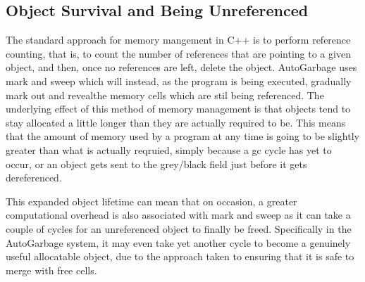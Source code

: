 \documentclass[11pt]{article}
\begin{document}
\subsection{Object Survival and Being Unreferenced}
\label{sec:org57a7dd4}
The standard approach for memory mangement in C++ is to perform reference counting, that is, to count the number of references
that are pointing to a given object, and then, once no references are left, delete the object. AutoGarbage uses mark 
and sweep which will instead, as the program is being executed, gradually mark out and revealthe memory cells which are stil
being referenced. The underlying effect of this method of memory management is that objects
tend to stay allocated a little longer than they are actually required to be.
This means that the amount of memory used by a program at any time is going to be slightly greater than what is actually 
reqruied, simply because a gc cycle has yet to occur, or an object gets sent to the grey/black field just before it gets dereferenced.

This expanded object lifetime can mean that on occasion, a greater computational overhead is also associated with mark and sweep
as it can take a couple of cycles for an unreferenced object to finally be freed. Specifically in the AutoGarbage system,
it may even take yet another cycle to become a genuinely useful allocatable object, due to the approach taken to 
ensuring that it is safe to merge with free cells.
\end{document}
